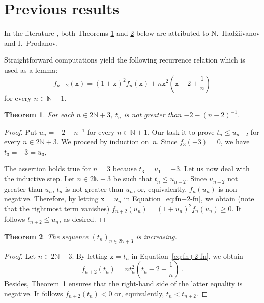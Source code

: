 \documentclass[12pt]{article}
\newcommand{\bN}{\mathbb{N}}
\newcommand{\ttx}{\mathtt{x}}
\newtheorem{theorem}{Theorem}
\begin{document}
 



 \section{Previous results} 

 In the literature \cite{MitrinovicCNIA, MitrinovicAI, MitrinovicP93, MondP94},
 both Theorems \ref{thm:HP-upper} and \ref{thm:HP-tn-increase} below are attributed to N.~Had\v{z}iivanov and I.~Prodanov.
 
 Straightforward computations yield the following recurrence relation which is used as a lemma:
 \begin{equation} \label{eq:fn+2-fn}
   f_{n + 2} (\ttx) = {(1 + \ttx)}^2 f_n(\ttx) + n \ttx^2 \left(\ttx + 2 + \frac{1}{n} \right)
 \end{equation}
 for every $n \in \bN + 1$.
 
 \begin{theorem} \label{thm:HP-upper}
   For each $n \in 2 \bN + 3$, $t_n$ is not greater than $- 2 - {(n - 2)}^{-1}$.
 \end{theorem}

 \begin{proof}
   Put $u_n = - 2 - n^{-1}$ for every $n \in \bN + 1$.
   Our task it to prove $t_n \le u_{n - 2}$ for every $n \in 2 \bN + 3$.
   We proceed by induction on~$n$.
   Since $f_3(- 3) = 0$,
   we have $t_3 = - 3 = u_3$, 
   
   The assertion holds true for $n = 3$ because $t_3 = u_1 = - 3$.
   Let us now deal with the inductive step.
   Let $n \in 2 \bN + 3$ be such that $t_n \le u_{n - 2}$.
   Since $u_{n - 2}$ not greater than $u_n$, $t_n$ is not greater than $u_n$, or, equivalently, $f_n(u_n)$ is non-negative.
   Therefore,  
   by letting $\ttx = u_n$ in Equation~\eqref{eq:fn+2-fn}, we obtain (note that the rightmost term vanishes)
   $f_{n + 2}(u_n) = {( 1 + u_n )}^2 f_n(u_n) \ge 0$.
   It follows $t_{n + 2} \le u_n$, as desired.
 \end{proof}
 
 
 
\begin{theorem} \label{thm:HP-tn-increase} 
  The sequence $\left( t_n \right)_{n \in 2 \bN + 3}$ is increasing.
 \end{theorem} 

 \begin{proof}
 Let $n \in 2 \bN + 3$.
 By letting $\ttx = t_n$ in Equation~\eqref{eq:fn+2-fn}, we obtain
 $$ 
f_{n + 2} (t_n) = n t_n^2 \left(t_n - 2 - \frac{1}{n} \right) \, .
$$
Besides, Theorem~\ref{thm:HP-upper} ensures that the right-hand side of the latter equality is negative.
It follows $f_{n + 2} (t_n) < 0$ or, equivalently, $t_n < t_{n + 2}$.
\end{proof}
\end{document}
